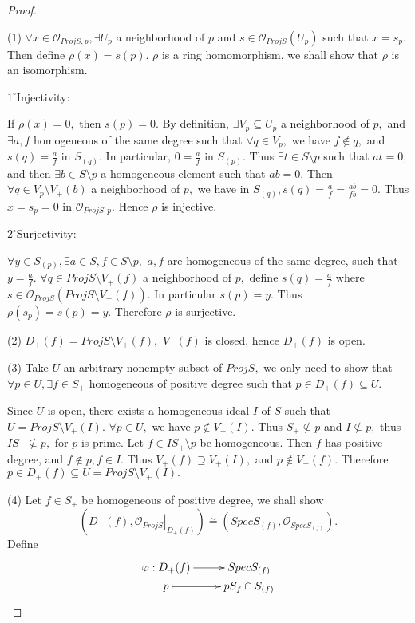 \begin{proof}\
\enum
\item[(1)]$\forall x\in \mathcal {O}_{ProjS,p}, \exists U_p$ a
neighborhood of $p$ and $s\in\mathcal {O}_{ProjS}(U_p)$ such that
$x=s_p.$ Then define $\rho(x)=s(p).$ $\rho$ is a ring homomorphism,
we shall show that $\rho$ is an isomorphism.

$\mathit{1^{\circ}}$Injectivity:

If $\rho(x)=0,$ then $s(p)=0.$ By definition, $\exists V_p\subseteq
U_p$ a neighborhood of $p,$ and $\exists a, f$ homogeneous of the
same degree such that $\forall q\in V_p,$ we have $f\not\in q,$ and
$s(q)=\frac{a}{f}$ in $S_{(q)}.$ In particular, $0=\frac{a}{f}$ in
$S_{(p)}.$ Thus $\exists t\in S\setminus p$ such that $at=0,$ and
then $\exists b\in S\setminus p$ a homogeneous element such that
$ab=0.$ Then $\forall q\in V_p\setminus V_+(b)$ a neighborhood of
$p,$ we have in $S_{(q)}, s(q)=\frac{a}{f}=\frac{ab}{fb}=0.$ Thus
$x=s_p=0$ in $\mathcal {O}_{ProjS,p}.$ Hence $\rho$ is injective.

$\mathit{2^{\circ}}$Surjectivity:

$\forall y\in S_{(p)}, \exists a\in S, f\in S\setminus p,$ $a, f$
are homogeneous of the same degree, such that $y=\frac{a}{f}.$
$\forall q\in ProjS\setminus V_+(f)$ a neighborhood of $p,$ define
$s(q)=\frac{a}{f}$ where $s\in \mathcal {O}_{ProjS}(ProjS\setminus
V_+(f)).$ In particular $s(p)=y.$ Thus $\rho(s_p)=s(p)=y.$ Therefore
$\rho$ is surjective.
\item[(2)]$D_+(f)=ProjS\setminus V_+(f),$ $V_+(f)$ is closed, hence
$D_+(f)$ is open.
\item[(3)]Take $U$ an arbitrary nonempty subset of $ProjS,$ we only
need to show that $\forall p\in U, \exists f\in S_+$ homogeneous of
positive degree such that $p\in D_+(f)\subseteq U.$

Since $U$ is open, there exists a homogeneous ideal $I$ of $S$ such
that $U=ProjS\setminus V_+(I).$ $\forall p\in U,$ we have $p\not\in
V_+(I).$ Thus $S_+\nsubseteq p$ and $I\nsubseteq p,$ thus
$IS_+\nsubseteq p,$ for $p$ is prime. Let $f\in IS_+\setminus p$ be
homogeneous. Then $f$ has positive degree, and $f\not\in p, f\in I.$
Thus $V_+(f)\supseteq V_+(I),$ and $p\not\in V_+(f).$ Therefore
$p\in D_+(f)\subseteq U=ProjS\setminus V_+(I).$
\item[(4)]Let $f\in S_+$ be homogeneous of positive degree, we shall
show $$(D_+(f),\left.\mathcal {O}_{ProjS}\right|_{D_+(f)})
\stackrel{\sim}{=}(SpecS_{(f)},\mathcal {O}_{SpecS_{(f)}}).$$ Define
\[ \xymatrix@R=0em{
   {\varphi:D_+(f)} \ar[r] & {SpecS_{(f)}} \\
   p \ar@{|->}[r] & {pS_f\cap S_{(f)}} }  \]


\end{proof}
